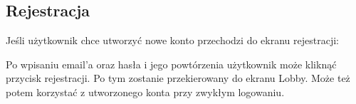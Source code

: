 \documentclass[12pt]{article}
\begin{document}
\newpage
\subsection{Rejestracja}
Jeśli użytkownik chce utworzyć nowe konto przechodzi do ekranu rejestracji:
\begin{figure}[!htb]
    \centering
    \centering
\end{figure}
Po wpisaniu email'a oraz hasła i jego powtórzenia użytkownik może kliknąć przycisk rejestracji. Po tym zostanie przekierowany do ekranu Lobby. Może też potem korzystać z utworzonego konta przy zwykłym logowaniu.
\end{document}
